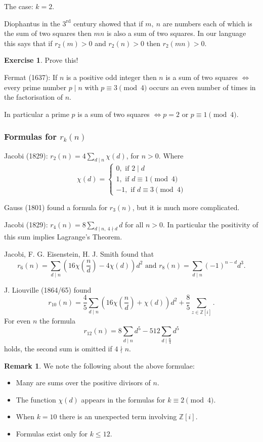 \documentclass{article}
\theoremstyle{definition}
\newtheorem*{exer}{Exercise}
\newtheorem*{rem}{Remark}
\begin{document}
The case: $k=2$.

Diophantus in the $3^\text{rd}$ century showed that if $m,\ n$ are numbers each of which is the sum of two squares then $mn$ is also a sum of two squares.
In our language this says that if $r_2(m) > 0$ and $r_2(n) > 0$ then $r_2(mn)>0$.

\begin{exer}
Prove this!
\end{exer}

Fermat (1637): If $n$ is a positive odd integer then $n$ is a sum of two squares $\iff$ every prime number $p\mid n$ with $p\equiv 3 \pmod{4}$ occurs an even number of times in the factorisation of $n$.

In particular a prime $p$ is a sum of two squares $\iff p = 2$ or $p\equiv 1\pmod{4}$.

\subsubsection{Formulas for $r_k(n)$}
Jacobi (1829): $r_2(n) = 4\sum_{d\mid n} \chi(d)$, for $n > 0$.
Where
\[\chi(d) = \begin{cases}
0, \text{ if } 2\mid d \\
1, \text{ if } d\equiv 1 \pmod{4} \\
-1, \text{ if } d\equiv 3 \pmod{4}
\end{cases}
\]

Gauss (1801) found a formula for $r_3(n)$, but it is much more complicated.

Jacobi (1829): $r_4(n) = 8\sum_{d\mid n,\ 4\nmid d}d$ for all $n > 0$.
In particular the positivity of this sum implies Lagrange's Theorem.

Jacobi, F. G. Eisenstein, H. J. Smith found that
\[
r_6(n) = \sum_{d\mid n}(16 \chi\left(\frac n d\right) - 4\chi(d))d^2
\text{ and }r_8(n) = \sum_{d\mid n}(-1)^{n-d}d^3.
\]

J. Liouville (1864/65) found 
\[
r_{10}(n) = \frac 4 5\sum_{d\mid n}(16\chi\left(\frac n d\right)  + \chi(d))d^2 + \frac 8 5 \sum_{z\in\mathbb{Z}[i]}.
\]
For even $n$ the formula 
\[
r_{12}(n) = 8\sum_{d\mid n} d^5 - 512\sum_{d\mid\frac n 4}d^5
\]
holds, the second sum is omitted if $4\nmid n$.

\begin{rem}
We note the following about the above formulae:
\begin{itemize}
\item Many are sums over the positive divisors of $n$.
\item The function $\chi(d)$ appears in the formulas for $k \equiv 2 \pmod 4$.
\item When $k=10$ there is an unexpected term involving $\mathbb{Z}[i]$.
\item Formulas exist only for $k\le 12$.
\end{itemize}
\end{rem}
\end{document}
